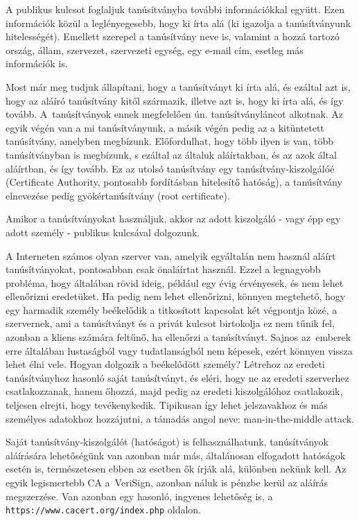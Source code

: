 A publikus kulcsot foglaljuk tanúsítványba további információkkal együtt. Ezen információk közül a leglényegesebb, hogy
ki írta alá (ki igazolja a tanúsítványunk hitelességét). Emellett szerepel a tanúsítvány neve is, valamint a hozzá
tartozó ország, állam, szervezet, szervezeti egység, egy e-mail cím, esetleg más információk is.

Most már meg tudjuk állapítani, hogy a tanúsítványt ki írta alá, és ezáltal azt is, hogy az aláíró tanúsítvány kitől
származik, illetve azt is, hogy ki írta alá, és így tovább. A~tanúsítványok ennek megfelelően 
ún. tanúsítványláncot alkotnak. Az egyik
végén van a mi tanúsítványunk, a másik végén pedig az a kitüntetett tanúsítvány, amelyben megbízunk. Előfordulhat, hogy
több ilyen is van, több tanúsítványban is megbízunk, s ezáltal az általuk aláírtakban, és az azok által aláírtban, és
így tovább. Ez az utolsó tanúsítvány egy tanúsítvány-kiszolgálóé (Certificate Authority, pontosabb fordításban hitelesítő
hatóság), a tanúsítvány elnevezése pedig gyökértanúsítvány (root certificate).

Amikor a tanúsítványokat használjuk, akkor az adott kiszolgáló - vagy épp egy adott személy - publikus kulcsával
dolgozunk.

A Interneten számos olyan szerver van, amelyik egyáltalán nem használ aláírt tanúsítványokat, pontosabban csak
önaláírtat használ. Ezzel a legnagyobb probléma, hogy általában rövid ideig, például egy évig érvényesek, és nem lehet
ellenőrizni eredetüket. Ha pedig nem lehet ellenőrizni, könnyen megtehető, hogy egy harmadik személy beékelődik a
titkosított kapcsolat két végpontja közé, a szervernek, ami a tanúsítványt és a privát kulcsot birtokolja ez nem tűnik
fel, azonban a kliens számára feltűnő, ha ellenőrzi a tanúsítványt. Sajnos az~emberek erre általában lustaságból vagy
tudatlanságból nem képesek, ezért könnyen vissza lehet élni vele. Hogyan dolgozik a beékelődött személy? Létrehoz az
eredeti tanúsítványhoz hasonló saját tanúsítványt, és eléri, hogy ne az eredeti szerverhez csatlakozzanak, hanem őhozzá,
majd pedig az eredeti kiszolgálóhoz csatlakozik, teljesen elrejti, hogy tevékenykedik. Tipikusan így lehet jelszavakhoz
és más személyes adatokhoz hozzájutni, a támadás angol neve: man-in-the-middle attack.

Saját tanúsítvány-kiszolgálót (hatóságot) is felhasználhatunk, tanúsítványok aláírására lehetőségünk van azonban már
más, általánosan elfogadott hatóságok esetén is, természetesen ebben az esetben ők írják alá, különben nekünk kell. Az
egyik legismertebb CA a~VeriSign, azonban náluk is pénzbe kerül az aláírás megszerzése. Van azonban egy hasonló,
ingyenes lehetőség is, a \texttt{https://www.cacert.org/index.php} oldalon.

